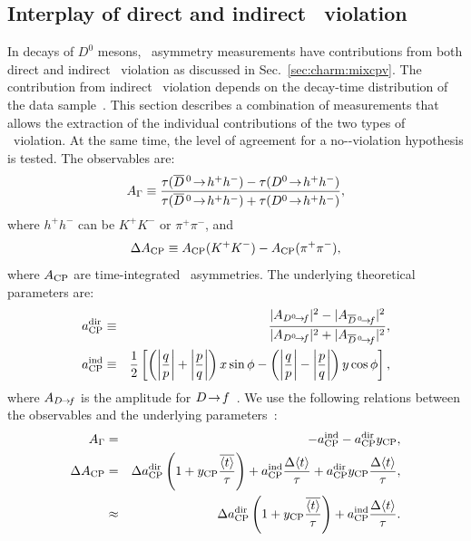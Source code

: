 \subsection{Interplay of direct and indirect \cp\ violation}
\label{sec:charm:cpvdir}

In decays of $D^0$ mesons, \cp\ asymmetry measurements have contributions from 
both direct and indirect \cp\ violation as discussed in Sec.~\ref{sec:charm:mixcpv}.
The contribution from indirect \cp\ violation depends on the decay-time distribution 
of the data sample~\cite{Kagan:2009gb}. This section describes a combination of 
measurements that allows the extraction of the individual contributions of the 
two types of \cp\ violation.
At the same time, the level of agreement for a no-\cp-violation hypothesis is 
tested. The observables are: 
\begin{equation}
A_{\Gamma} \equiv \frac{\tau(\dbar \ra h^+ h^-) - \tau(D^0 \ra h^+ h^- )}
{\tau(\dbar \ra h^+ h^-) + \tau(D^0 \ra h^+ h^- )},
\end{equation}
where $h^+ h^-$ can be $K^+ K^-$ or $\pi^+\pi^-$, and 
\begin{equation}
\Delta A_{\rm CP}   \equiv A_{\rm CP}(K^+K^-) - A_{\rm CP}(\pi^+\pi^-),
\end{equation}
where $A_{\rm CP}$ are time-integrated \cp\ asymmetries. The underlying 
theoretical parameters are: 
\begin{eqnarray}
a_{\rm CP}^{\rm dir} & \equiv & \frac{|A_{D^0\ra f} |^2 - |A_{\dbar\ra f} |^2} 
{|A_{D^0\ra f} |^2 + |A_{\dbar\ra f} |^2} ,\nonumber\\ 
a_{\rm CP}^{\rm ind}  & \equiv & \frac{1}{2} 
\left[ \left(\left|\frac{q}{p}\right| + \left|\frac{p}{q}\right|\right) x \sin \phi - 
\left(\left|\frac{q}{p}\right| - \left|\frac{p}{q}\right|\right) y \cos \phi \right] ,
\end{eqnarray}
where $A_{D\!\rightarrow\! f}$ is the amplitude for $D\!\rightarrow\! f$~\cite{Grossman:2006jg}. 
We use the following relations 
between the observables and the underlying parameters~\cite{Gersabeck:2011xj}: 
\begin{eqnarray}
A_{\Gamma} & = & - a_{\rm CP}^{\rm ind} - a_{\rm CP}^{\rm dir} y_{\rm CP},\nonumber\\ 
\Delta A_{\rm CP} & = &  \Delta a_{\rm CP}^{\rm dir} \left(1 + y_{\rm CP} 
\frac{\overline{\langle t\rangle}}{\tau} \right)   +   
   a_{\rm CP}^{\rm ind} \frac{\Delta\langle t\rangle}{\tau}   +   
  a_{\rm CP}^{\rm dir} y_{\rm CP} \frac{\Delta\langle t\rangle}{\tau},\\ 
& \approx & \Delta a_{\rm CP}^{\rm dir} \left(1 + y_{\rm CP} 
\frac{\overline{\langle t\rangle}}{\tau} \right)   +   a_{\rm CP}^{\rm ind} 
\frac{\Delta\langle t\rangle}{\tau}.
\end{eqnarray}
